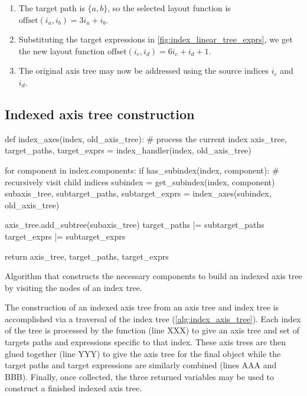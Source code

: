 \documentclass[thesis]{subfiles}
\begin{document}
\begin{enumerate}
  \item
    The target path is $\{a, b\}$, so the selected layout function is $\mathrm{offset}(i_a, i_b) = 3 i_a + i_b$.
  \item
    Substituting the target expressions in \cref{fig:index_linear_tree_exprs}, we get the new layout function $\mathrm{offset}(i_c, i_d) = 6 i_c + i_d + 1$.
  \item
    The original axis tree may now be addressed using the source indices $i_c$ and $i_d$.
\end{enumerate}

\subsection{Indexed axis tree construction}

\begin{algorithm}
  \begin{pyalg}
    def index_axes(index, old_axis_tree):
      # process the current index
      axis_tree, target_paths, target_exprs = index_handler(index, old_axis_tree)

      for component in index.components:
        if has_subindex(index, component):
          # recursively visit child indices
          subindex = get_subindex(index, component)
          subaxis_tree, subtarget_paths, subtarget_exprs = index_axes(subindex, old_axis_tree)

          axis_tree.add_subtree(subaxis_tree)
          target_paths |= subtarget_paths
          target_exprs |= subtarget_exprs

      return axis_tree, target_paths, target_exprs
  \end{pyalg}

  \caption{
    Algorithm that constructs the necessary components to build an indexed axis tree by visiting the nodes of an index tree.
  }
  \label{alg:index_axis_tree}
\end{algorithm}

The construction of an indexed axis tree from an axis tree and index tree is accomplished via a traversal of the index tree (\cref{alg:index_axis_tree}).
Each index of the tree is processed by the function  (line XXX) to give an axis tree and set of targets paths and expressions specific to that index.
These axis trees are then glued together (line YYY) to give the axis tree for the final object while the target paths and target expressions are similarly combined (lines AAA and BBB).
Finally, once collected, the three returned variables may be used to construct a finished indexed axis tree.
\end{document}
